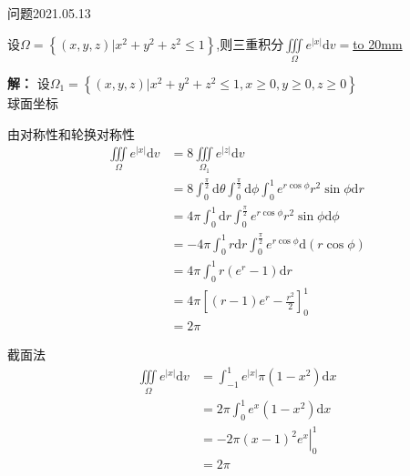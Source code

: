 \begin{mybox}{问题2021.05.13}
	
	\qquad 设$\Omega = \left\lbrace \left. (x,y,z)\right| x^2+y^2+z^2\le 1 \right\rbrace $,则三重积分$\iiint \limits_{\Omega} e^{\left|x\right|} \mathrm{d} v=$\underline{\hbox to 20mm{}}
\end{mybox}
\noindent
\textbf{解：}
设$\Omega_{1} = \left\lbrace \left. (x,y,z)\right| x^2+y^2+z^2\le 1,x\ge0,y\ge0,z\ge0 \right\rbrace $\\
球面坐标

由对称性和轮换对称性
\begin{align*}
	\iiint \limits_{\Omega} e^{\left|x\right|} \mathrm{d} v &= 8\iiint \limits_{\Omega_{1}} e^{\left|z\right|} \mathrm{d} v\\
	&=8\int_{0}^{\frac{\pi}{2}}\mathrm{d}\theta \int_{0}^{\frac{\pi}{2}}\mathrm{d}\phi \int_{0}^{1} e^{r\cos \phi} r^2 \sin \phi \mathrm{d}r\\
	&=4\pi\int_{0}^{1} \mathrm{d}r \int_{0}^{\frac{\pi}{2}} e^{r\cos \phi}r^2 \sin \phi  \mathrm{d}\phi\\
	&=-4\pi\int_{0}^{1} r \mathrm{d} r \int_{0}^{\frac{\pi}{2}} e^{r\cos\phi}\mathrm{d}(r\cos\phi)\\
	&=4\pi\int_{0}^{1} r(e^{r}-1)\mathrm{d}r\\
	&=4\pi\left[(r-1)e^{r} -\frac{r^2}{2}\right]_{0}^{1}\\
	&=2\pi
\end{align*}

截面法
\begin{align*}
	\iiint \limits_{\Omega} e^{\left|x\right|} \mathrm{d} v &=\int_{-1}^{1} e^{\left|x\right|} \pi(1-x^2)\mathrm{d} x\\
	&=2\pi\int_{0}^{1}e^{x}(1-x^2)\mathrm{d}x\\
	&=\left. -2\pi(x-1)^2 e^{x} \right|_{0}^{1}\\
	&=2\pi
\end{align*}